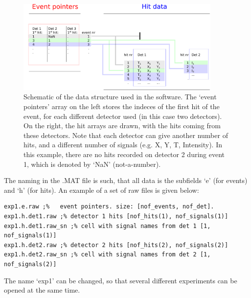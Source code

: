 \begin{figure}[h]
   \centering
    \centerline{\includegraphics[width=0.9\textwidth]{Graphics/data_structure_schematic.pdf}}
\caption{Schematic of the data structure used in the software. The `event pointers' array on the left stores the indeces of the first hit of the event, for each different detector used (in this case two detectors). On the right, the hit arrays are drawn, with the hits coming from these detectors. Note that each detector can give another number of hits, and a different number of signals (e.g. X, Y, T, Intensity). In this example, there are no hits recorded on detector 2 during event 1, which is denoted by `NaN' (not-a-number).}
\label{Data_structure_schematic_intro}
\end{figure}

The naming in the .MAT file is such, that all data is the subfields `e' (for events) and `h' (for hits). An example of a set of raw files is given below:

\lstset{language=MATLAB}
\begin{lstlisting}
exp1.e.raw ;% 	event pointers. size: [nof_events, nof_det]. 
exp1.h.det1.raw ;% detector 1 hits [nof_hits(1), nof_signals(1)]
exp1.h.det1.raw_sn ;% cell with signal names from det 1 [1, nof_signals(1)]
exp1.h.det2.raw ;% detector 2 hits [nof_hits(2), nof_signals(2)]
exp1.h.det2.raw_sn ;% cell with signal names from det 2 [1, nof_signals(2)]
\end{lstlisting}

The name `exp1' can be changed, so that several different experiments can be opened at the same time.
